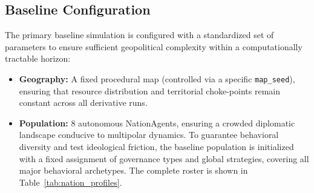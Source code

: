 \subsection*{Baseline Configuration}
The primary baseline simulation is configured with a standardized set of parameters to ensure sufficient geopolitical complexity within a computationally tractable horizon:
\begin{itemize}
    \item \textbf{Geography:} A fixed procedural map (controlled via a specific \texttt{map\_seed}), ensuring that resource distribution and territorial choke-points remain constant across all derivative runs.
    \item \textbf{Population:} $8$ autonomous NationAgents, ensuring a crowded diplomatic landscape conducive to multipolar dynamics. To guarantee behavioral diversity and test ideological friction, the baseline population is initialized with a fixed assignment of governance types and global strategies, covering all major behavioral archetypes. The complete roster is shown in Table~\ref{tab:nation_profiles}.


\end{itemize}
